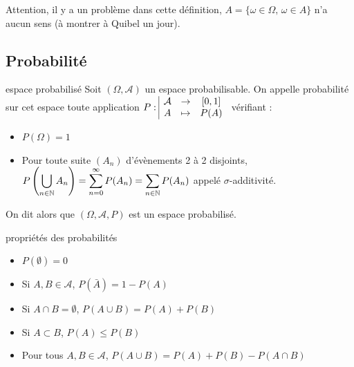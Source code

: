 Attention, il y a un problème dans cette définition, $A = \{ \omega \in \Omega, \, \omega \in A\}$ 
n'a aucun sens (à montrer à Quibel un jour).

\subsection{Probabilité}

\begin{definition}{espace probabilisé}{}
    Soit $(\Omega, \mathcal A)$ un espace probabilisable. On appelle probabilité 
    sur cet espace toute application $P: \space \begin{array}{|ccc} \displaystyle \mathcal A & \to & \displaystyle [0, 1] \\ \displaystyle A & \mapsto & \displaystyle P(A) \end{array}$
    vérifiant :
    \begin{itemize}
        \item $P(\Omega) = 1$
        \item Pour toute suite $(A_n)$ d'évènements 2 à 2 disjoints, 
        $\displaystyle P\left( \bigcup_{n \in \mathbb{N}} A_n \right) = \sum_{n = 0 }^{\infty    } P(A_n ) = \sum_{n \in \mathbb{N}    } P(A_n)$
        appelé $\sigma$-additivité.
    \end{itemize}

    On dit alors que $(\Omega, \mathcal A, P)$ est un espace probabilisé. 
\end{definition}

\begin{proposition}{propriétés des probabilités}{}
    \begin{itemize}
        \item $P(\emptyset) = 0$
        \item Si $A, B \in \mathcal A$, $P(\bar A) = 1 - P(A)$
        \item Si $A \cap B = \emptyset$, $P(A \cup B) = P(A) + P(B)$
        \item Si $A \subset B$, $P(A) \leqslant P(B)$
        \item Pour tous $A, B \in \mathcal A$, $P(A \cup B) = P(A) + P(B) - P(A \cap B)$
    \end{itemize}
\end{proposition}

